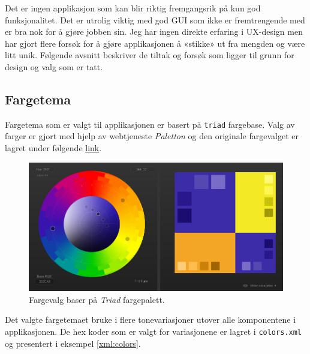 Det er ingen applikasjon som kan blir riktig fremgangsrik på kun god funksjonalitet. Det er utrolig viktig med god GUI som ikke er fremtrengende med er bra nok for å gjøre jobben sin. Jeg har ingen direkte erfaring i UX-design men har gjort flere forsøk for å gjøre applikasjonen å «stikke» ut fra mengden og være litt unik. Følgende avsnitt beskriver de tiltak og forsøk som ligger til grunn for design og valg som er tatt.

\subsection{Fargetema} \label{sub:farger}
Fargetema som er valgt til applikasjonen er basert på \texttt{triad} fargebase. Valg av farger er gjort med hjelp av webtjeneste \textit{Paletton} og den originale fargevalget er lagret under følgende \href{http://paletton.com/#uid=3470u0krausgVEBm0wFuzpjybk1}{link}.

\begin{figure}[ht]
\centering
 \includegraphics[scale=0.25]{./img/gui/4.png}
 \caption{Fargevalg baser på \textit{Triad} fargepalett.}
 \label{fig:gui_colors}
\end{figure}


Det valgte fargetemaet bruke i flere tonevariasjoner utover alle komponentene i applikasjonen. De hex koder som er valgt for variasjonene er lagret i \texttt{colors.xml} og presentert i eksempel \ref{xml:colors}.

